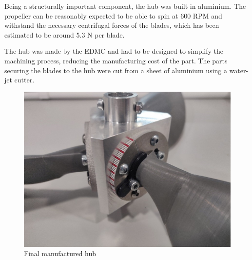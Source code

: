 Being a structurally important component, the hub was built in aluminium. The propeller can be reasonably expected to be able to spin at 600 RPM and withstand the necessary centrifugal forces of the blades, which has been estimated to be around 5.3 N per blade.

The hub was made by the EDMC and had to be designed to simplify the machining process, reducing the manufacturing cost of the part. The parts securing the blades to the hub were cut from a sheet of aluminium using a water-jet cutter.

\begin{figure}[tbp]
    \centering
    \includegraphics{images/part7/finalphoto.jpg}
    \caption{Final manufactured hub}
    \label{fig:finalhub}
\end{figure}
